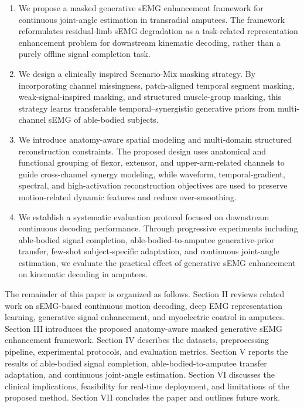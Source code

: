 \documentclass[journal]{IEEEtran}
\begin{document}
\begin{enumerate}
    \item We propose a masked generative sEMG enhancement framework for continuous joint-angle estimation in transradial amputees. The framework reformulates residual-limb sEMG degradation as a task-related representation enhancement problem for downstream kinematic decoding, rather than a purely offline signal completion task.

    \item We design a clinically inspired Scenario-Mix masking strategy. By incorporating channel missingness, patch-aligned temporal segment masking, weak-signal-inspired masking, and structured muscle-group masking, this strategy learns transferable temporal--synergistic generative priors from multi-channel sEMG of able-bodied subjects.

    \item We introduce anatomy-aware spatial modeling and multi-domain structured reconstruction constraints. The proposed design uses anatomical and functional grouping of flexor, extensor, and upper-arm-related channels to guide cross-channel synergy modeling, while waveform, temporal-gradient, spectral, and high-activation reconstruction objectives are used to preserve motion-related dynamic features and reduce over-smoothing.

    \item We establish a systematic evaluation protocol focused on downstream continuous decoding performance. Through progressive experiments including able-bodied signal completion, able-bodied-to-amputee generative-prior transfer, few-shot subject-specific adaptation, and continuous joint-angle estimation, we evaluate the practical effect of generative sEMG enhancement on kinematic decoding in amputees.
\end{enumerate}

The remainder of this paper is organized as follows. Section II reviews related work on sEMG-based continuous motion decoding, deep EMG representation learning, generative signal enhancement, and myoelectric control in amputees. Section III introduces the proposed anatomy-aware masked generative sEMG enhancement framework. Section IV describes the datasets, preprocessing pipeline, experimental protocols, and evaluation metrics. Section V reports the results of able-bodied signal completion, able-bodied-to-amputee transfer adaptation, and continuous joint-angle estimation. Section VI discusses the clinical implications, feasibility for real-time deployment, and limitations of the proposed method. Section VII concludes the paper and outlines future work.
\end{document}
